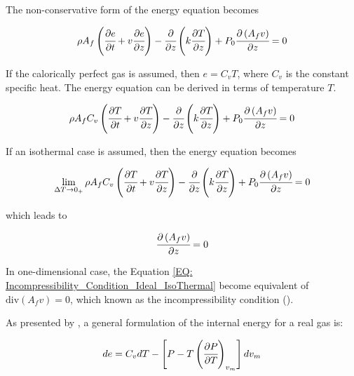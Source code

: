 \documentclass[../Article_Model_Parameters.tex]{subfiles}
\begin{document}
	The non-conservative form of the energy equation becomes
	
	{\footnotesize
		\begin{equation*}
			\rho A_f \left( \cfrac{\partial e }{\partial t} + v \cfrac{\partial e}{\partial z} \right) - \cfrac{\partial}{\partial z} \left( k \cfrac{\partial T}{\partial z} \right) + P_0 \cfrac{\partial \left(A_f v\right)}{\partial z} = 0
		\end{equation*}
	}
	
	If the calorically perfect gas is assumed, then $e=C_vT$, where $C_v$ is the constant specific heat. The energy equation can be derived in terms of temperature $T$.
	
	{\footnotesize
		\begin{equation*}
			\rho A_f C_v \left( \cfrac{\partial T }{\partial t} + v \cfrac{\partial T}{\partial z} \right) - \cfrac{\partial}{\partial z} \left( k \cfrac{\partial T}{\partial z} \right) + P_0 \cfrac{\partial \left(A_f v\right)}{\partial z} = 0
		\end{equation*}
	}
	
	If an isothermal case is assumed, then the energy equation becomes
	
	{\footnotesize
		\begin{equation*}
			\lim_{\Delta T \rightarrow 0_+} \rho A_f C_v \left( \cfrac{\partial T }{\partial t} + v \cfrac{\partial T}{\partial z} \right) - \cfrac{\partial}{\partial z} \left( k \cfrac{\partial T}{\partial z} \right) + P_0 \cfrac{\partial \left(A_f v\right)}{\partial z} = 0
		\end{equation*}
	}
	
	which leads to
	
	{\footnotesize
		\begin{equation}
			\cfrac{\partial \left(A_f v\right)}{\partial z} = 0
			\label{EQ: Incompressibility_Condition_Ideal_IsoThermal}
		\end{equation}
	}
	
	In one-dimensional case, the Equation \ref{EQ: Incompressibility_Condition_Ideal_IsoThermal} become equivalent of $\text{div} ( A_f v) = 0$, which known as the incompressibility condition (\citet{Lions2013}). 
	
	As presented by \citet{Elliott2011}, a general formulation of the internal energy for a real gas is:
	
	{\footnotesize
		\begin{equation*}
			de=C_vdT-\left[P-T\left(\cfrac{\partial P}{\partial T}\right)_{v_m}\right]dv_m
	\end{equation*} }
	
\end{document}
